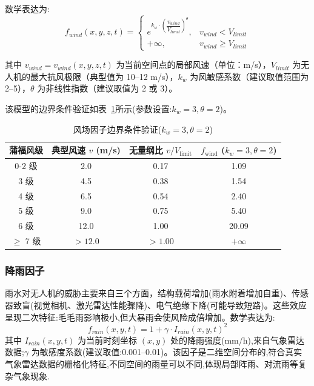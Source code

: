 数学表达为:
\begin{equation}
f_{wind}(x,y,z,t) = 
\begin{cases} 
e^{k_w \cdot \left( \dfrac{v_{wind}}{V_{limit}} \right)^\theta}, & v_{wind} < V_{limit} \\
+\infty, & v_{wind} \ge V_{limit} 
\end{cases}
\label{eq:f_wind}
\end{equation}

其中 $v_{wind} = v_{wind}(x,y,z,t)$ 为当前空间点的局部风速（单位：m/s），$V_{limit}$ 为无人机的最大抗风极限（典型值为 10--12 m/s），$k_w$ 为风敏感系数（建议取值范围为 2--5），$\theta$ 为非线性指数（建议取值为 2 或 3）。

该模型的边界条件验证如表~\ref{tab:wind_speed}所示(参数设置:$k_w=3, \theta=2$)。


\begin{table}[htbp]
\centering
\caption{风场因子边界条件验证($k_w=3, \theta=2$)}
\label{tab:wind_speed} %
\begin{tabular}{c c c c}
\toprule
\textbf{蒲福风级} & \textbf{典型风速 $v$ (m/s)} & \textbf{无量纲比 $v/V_{\text{limit}}$} & \textbf{$f_{\text{wind}}$ ($k_w=3, \theta=2$)} \\
\midrule
0-2 级 & 2.0 & 0.17 & 1.09 \\
3 级 & 4.5 & 0.38 & 1.54 \\
4 级 & 6.5 & 0.54 & 2.40 \\
5 级 & 9.0 & 0.75 & 5.40 \\
6 级 & 12.0 & 1.00 & 20.09 \\
$\geq$ 7 级 & $>12.0$ & $>1.00$ & $+\infty$\\
\bottomrule
\end{tabular}
\end{table}

\subsubsection[Rainfall Factor]{降雨因子}
\label{subsubsec:f_rain}

雨水对无人机的威胁主要来自三个方面，结构载荷增加(雨水附着增加自重)、传感器致盲(视觉相机、激光雷达性能骤降)、电气绝缘下降(可能导致短路)。这些效应呈现二次特征:毛毛雨影响极小,但大暴雨会使风险成倍增加。数学表达为:
\begin{equation}
f_{rain}(x,y,t) = 1 + \gamma \cdot I_{rain}(x,y,t)^2
\label{eq:f_rain}
\end{equation}
其中 $I_{rain}(x,y,t)$ 为当前时刻坐标 $(x,y)$ 处的降雨强度(mm/h),来自气象雷达数据;$\gamma$ 为敏感度系数(建议取值:0.001--0.01)。该因子是二维空间分布的,符合真实气象雷达数据的栅格化特征,不同空间的雨量可以不同,体现局部阵雨、对流雨等复杂气象现象.



